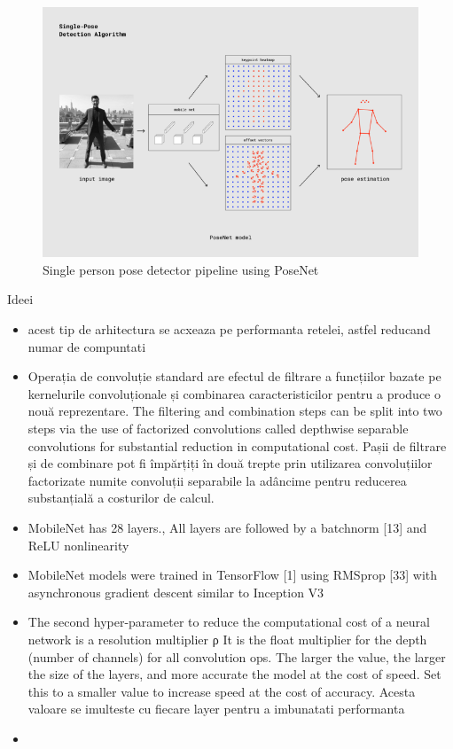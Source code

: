  \begin{figure}[htbp]
	\centerline{\includegraphics[scale=0.5]{fig/posenet.png}}  
	\caption{Single person pose detector pipeline using PoseNet}
	\label{fig:posenet-work}
\end{figure}
Ideei \cite{DBLP:journals/corr/HowardZCKWWAA17}
 \begin{itemize}
     \item acest tip de arhitectura se acxeaza pe performanta retelei, astfel reducand numar de compuntati
     \item  Operația de convoluție standard are efectul de filtrare a funcțiilor bazate pe kernelurile convoluționale și    combinarea caracteristicilor pentru a produce o nouă reprezentare.
         The filtering and combination steps can be split into two
        steps via the use of factorized convolutions called depthwise separable convolutions for substantial reduction in computational cost.
         Pașii de filtrare și de combinare pot fi împărțiți în două
        trepte prin utilizarea convoluțiilor factorizate numite convoluții separabile la adâncime pentru reducerea substanțială a costurilor de calcul.
    \item MobileNet has 28 layers., All layers are followed by a batchnorm [13] and ReLU nonlinearity 
    \item MobileNet models were trained in TensorFlow [1] using RMSprop [33] with asynchronous gradient descent similar
    to Inception V3 
    \item The second hyper-parameter to reduce the computational cost of a neural network is a resolution multiplier ρ
    It is the float multiplier for the depth (number of channels) for all convolution ops. The larger the value, the larger the size of the layers, and more accurate the model at the cost of speed. Set this to a smaller value to increase speed at the cost of accuracy.
    Acesta valoare se imulteste cu fiecare layer pentru a imbunatati performanta
    \item 
 \end{itemize}

